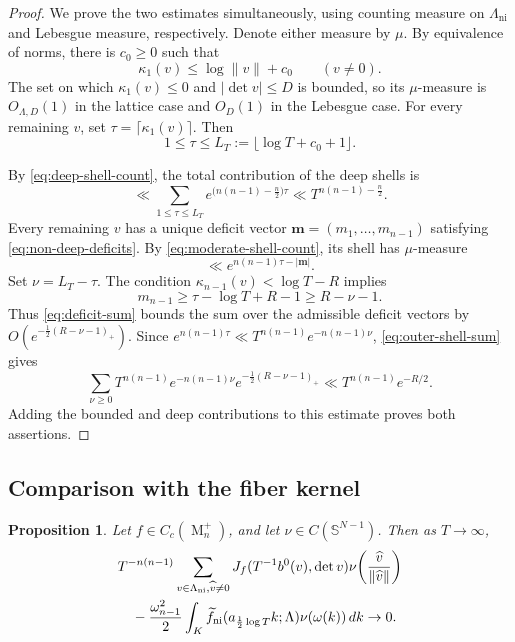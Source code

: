 \documentclass[reqno,11pt]{amsart}
\numberwithin{equation}{section}
\newtheorem{proposition}[theorem]{Proposition}
\theoremstyle{definition}
\theoremstyle{remark}
\newcommand{\op}{\operatorname}
\newcommand{\M}{\op{M}}
\begin{document}
\begin{proof}
We prove the two estimates simultaneously, using  counting
measure on $\Lambda_{\operatorname{ni}}$ and Lebesgue measure, respectively. Denote
either measure by $\mu$.  By equivalence of norms, there is $c_0\ge0$
such that
$$
\kappa_1(v)\le\log\|v\|+c_0\qquad(v\ne0).
$$
The set on which $\kappa_1(v)\le0$ and $|\det v|\le D$ is bounded, so
its $\mu$-measure is $O_{\Lambda,D}(1)$ in the lattice case and $O_D(1)$
in the Lebesgue case.  For every remaining $v$, set
$\tau=\lceil\kappa_1(v)\rceil$.  Then
$$
1\le\tau\le L_T:=\lfloor\log T+c_0+1\rfloor.
$$

By \eqref{eq:deep-shell-count}, the
total contribution of the deep shells is
$$
\ll\sum_{1\le\tau\le L_T}e^{\bigl(n(n-1)-\frac n2\bigr)\tau}
\ll T^{n(n-1)-\frac n2}.
$$
Every remaining $v$ has a unique deficit vector
$\mathbf m=(m_1,\ldots,m_{n-1})$ satisfying
\eqref{eq:non-deep-deficits}.  By
\eqref{eq:moderate-shell-count}, its shell has $\mu$-measure
$$
\ll e^{n(n-1)\tau-|\mathbf m|}.
$$
Set $\nu=L_T-\tau$. The condition
$\kappa_{n-1}(v)<\log T-R$ implies
$$
m_{n-1}
\ge\tau-\log T+R-1
\ge R-\nu-1.
$$
Thus \eqref{eq:deficit-sum} bounds the sum over the admissible deficit
vectors by $O(e^{-\frac12(R-\nu-1)_+})$. Since
$e^{n(n-1)\tau}\ll T^{n(n-1)}e^{-n(n-1)\nu}$, \eqref{eq:outer-shell-sum} gives
$$
\sum_{\nu\ge0}T^{n(n-1)}e^{-n(n-1)\nu}
e^{-\frac12(R-\nu-1)_+}
\ll T^{n(n-1)}e^{-R/2}.
$$
Adding the bounded and deep contributions to this estimate proves both assertions.
\end{proof}

\subsection{Comparison with the fiber kernel}
\begin{proposition}
\label{emm3.7}
Let $f\in C_c(\M_n^+)$, and let
$\nu\in C(\mathbb S^{N-1})$.  Then as $T\to\infty$,
\begin{align}\label{eq:kernel-lattice-comparison}
&T^{-n(n-1)}
\sum_{\substack{v\in\Lambda_{\operatorname{ni}},\widehat v\ne0}}
J_f(T^{-1}b^0(v),\det v)
\nu\!\left(\frac{\widehat v}{\|\widehat v\|}\right)\notag\\
&\quad-
\frac{\omega_{n-1}^2}{2}
\int_K
\widetilde f_{\operatorname{ni}}
   (a_{\frac12\log T}k;\Lambda)
\nu(\omega(k))\,dk
\to0.
\end{align}

\end{proposition}
\end{document}
